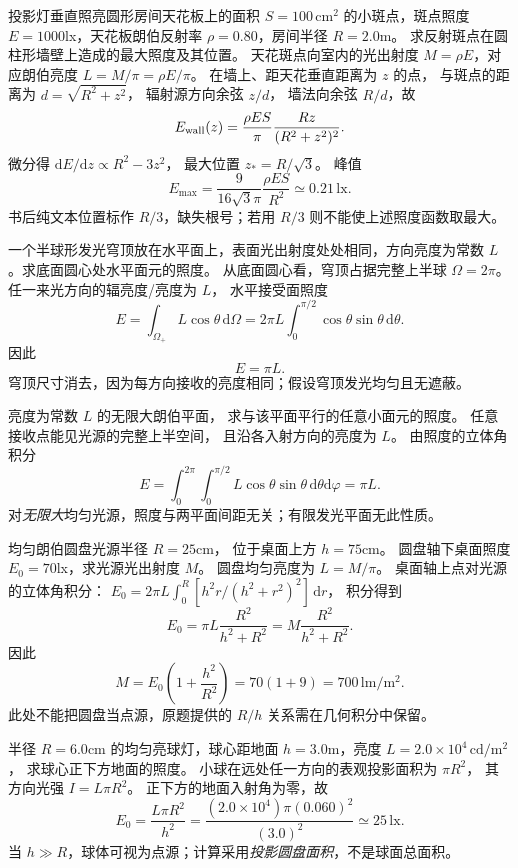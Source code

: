 投影灯垂直照亮圆形房间天花板上的面积
$S=100\,\mathrm{cm^2}$ 的小斑点，斑点照度
$E=1000$lx，天花板朗伯反射率
$\rho=0.80$，房间半径 $R=2.0$m。
求反射斑点在圆柱形墙壁上造成的最大照度及其位置。
\exsolution
天花斑点向室内的光出射度
$M=\rho E$，对应朗伯亮度
$L=M/\pi=\rho E/\pi$。
在墙上、距天花垂直距离为 $z$ 的点，
与斑点的距离为 $d=\sqrt{R^2+z^2}$，
辐射源方向余弦 $z/d$，
墙法向余弦 $R/d$，故
\[
E_{\rm wall}(z)=\frac{\rho ES}{\pi}
\frac{Rz}{(R^2+z^2)^2}.
\]
微分得
$\mathrm dE/\mathrm dz\propto R^2-3z^2$，
最大位置
$\boxed{z_*=R/\sqrt3}$。
峰值
\[
\boxed{E_{\max}=
\frac{9}{16\sqrt3\pi}\frac{\rho ES}{R^2}
\simeq0.21\,\mathrm{lx}}.
\]
\excheck 书后纯文本位置标作 $R/3$，缺失根号；若用 $R/3$ 则不能使上述照度函数取最大。

一个半球形发光穹顶放在水平面上，表面光出射度处处相同，方向亮度为常数 $L$。求底面圆心处水平面元的照度。
\exsolution
从底面圆心看，穹顶占据完整上半球
$\Omega=2\pi$。
任一来光方向的辐亮度/亮度为 $L$，
水平接受面照度
\[
E=\int_{\Omega_+}L\cos\theta\,\mathrm d\Omega
=2\pi L\int_0^{\pi/2}
\cos\theta\sin\theta\,\mathrm d\theta.
\]
因此
\[
\boxed{E=\pi L}.
\]
\excheck 穹顶尺寸消去，因为每方向接收的亮度相同；假设穹顶发光均匀且无遮蔽。

亮度为常数 $L$ 的无限大朗伯平面，
求与该平面平行的任意小面元的照度。
\exsolution
任意接收点能见光源的完整上半空间，
且沿各入射方向的亮度为 $L$。
由照度的立体角积分
\[
\boxed{E=\int_0^{2\pi}\int_0^{\pi/2}
L\cos\theta\sin\theta\,
\mathrm d\theta\mathrm d\varphi=\pi L}.
\]
\excheck 对\emph{无限大}均匀光源，照度与两平面间距无关；有限发光平面无此性质。

均匀朗伯圆盘光源半径 $R=25$cm，
位于桌面上方 $h=75$cm。
圆盘轴下桌面照度 $E_0=70$lx，求光源光出射度 $M$。
\exsolution
圆盘均匀亮度为 $L=M/\pi$。
桌面轴上点对光源的立体角积分：
$E_0=2\pi L\int_0^R
[h^2r/(h^2+r^2)^2]\,\mathrm dr$，
积分得到
\[
E_0=\pi L\frac{R^2}{h^2+R^2}
=M\frac{R^2}{h^2+R^2}.
\]
因此
\[
\boxed{M=E_0\left(1+\frac{h^2}{R^2}\right)
=70(1+9)=700\,\mathrm{lm/m^2}}.
\]
\excheck 此处不能把圆盘当点源，原题提供的 $R/h$ 关系需在几何积分中保留。

半径 $R=6.0$cm 的均匀亮球灯，球心距地面
$h=3.0$m，亮度
$L=2.0\times10^4\,\mathrm{cd/m^2}$，
求球心正下方地面的照度。
\exsolution
小球在远处任一方向的表观投影面积为 $\pi R^2$，
其方向光强 $I=L\pi R^2$。
正下方的地面入射角为零，故
\[
\boxed{E_0=\frac{L\pi R^2}{h^2}}
=\frac{(2.0\times10^4)\pi(0.060)^2}{(3.0)^2}
\simeq25\,\mathrm{lx}.
\]
\excheck 当 $h\gg R$，球体可视为点源；计算采用\emph{投影圆盘面积}，不是球面总面积。
